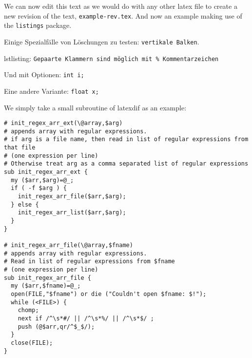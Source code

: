 \documentclass{article}
\begin{document}
We can now edit
this text as we would do with any other latex file to create
a new revision of the text, \verb|example-rev.tex|.
\newpage
And now an example making use of the \lstinline|listings| package.

Einige Spezialf\"alle von L\"oschungen zu testen: \verb|vertikale Balken|.

lstlisting: \lstinline{Gepaarte Klammern sind möglich mit % Kommentarzeichen}

Und mit Optionen: \lstinline[basicstyle=\footnotesize]{int i;}

Eine andere Variante:   \lstinline[basicstyle=\footnotesize]$float x;$ 


We simply take a small subroutine of latexdif as an example:
\lstset{language=perl}
\begin{lstlisting}[commentstyle=\color{gray}]
# init_regex_arr_ext(\@array,$arg)
# appends array with regular expressions.
# if arg is a file name, then read in list of regular expressions from that file
# (one expression per line)
# Otherwise treat arg as a comma separated list of regular expressions
sub init_regex_arr_ext {
  my ($arr,$arg)=@_;
  if ( -f $arg ) {
    init_regex_arr_file($arr,$arg);
  } else {
    init_regex_arr_list($arr,$arg);
  }
}

# init_regex_arr_file(\@array,$fname)
# appends array with regular expressions.
# Read in list of regular expressions from $fname
# (one expression per line)
sub init_regex_arr_file {
  my ($arr,$fname)=@_;
  open(FILE,"$fname") or die ("Couldn't open $fname: $!");
  while (<FILE>) {
    chomp;
    next if /^\s*#/ || /^\s*%/ || /^\s*$/ ;
    push (@$arr,qr/^$_$/);
  }
  close(FILE);
}
\end{lstlisting}
\end{document}
